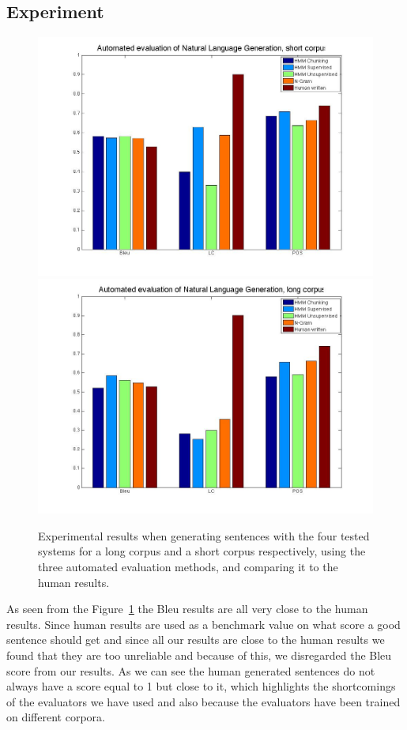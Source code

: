 \documentclass[a4paper,12pt]{article}
\begin{document}
\subsection{Experiment}
\begin{figure}
\centering
\includegraphics[width=0.8\linewidth]{resultsShort}
\includegraphics[width=0.8\linewidth]{results}
\caption{Experimental results when generating sentences with the four tested systems for a long corpus and a short corpus respectively, using the three automated evaluation methods, and comparing it to the human results.}
\label{fig:longresults}
\end{figure}

As seen from the Figure~\ref{fig:longresults} the Bleu results are all very close to the human results. Since human results are used as a
benchmark value on what score a good sentence should get and since all our results are close to the human results
we found that they are too unreliable  and because of this, we disregarded the
Bleu score from our results.
As we can see the human generated sentences do not always have a score equal to 1 but close to it, which
highlights the shortcomings of the evaluators we have used and also because the evaluators have been trained on
different corpora.
\end{document}
